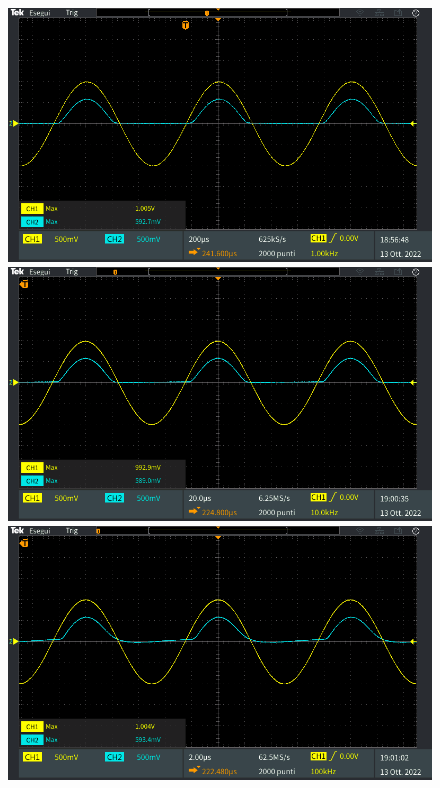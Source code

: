 \begin{figure}[tbh]
	\centering
	\begin{minipage}{.496\textwidth}
		\includegraphics[width=\linewidth]{./ImageFiles/Laboratorio 2/TEK00011.PNG}
	\end{minipage}
	\begin{minipage}{.496\textwidth}
		\includegraphics[width=\linewidth]{./ImageFiles/Laboratorio 2/TEK00012.PNG}
	\end{minipage}
	\begin{minipage}{.496\textwidth}
		\includegraphics[width=\linewidth]{./ImageFiles/Laboratorio 2/TEK00013.PNG}

\end{minipage}
\end{figure}
